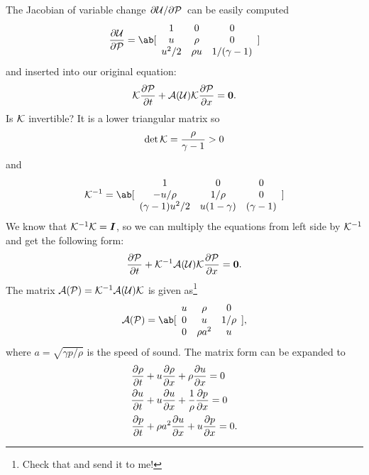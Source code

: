\documentclass[justified, nobib]{tufte-handout}
\begin{document}
The Jacobian of variable change \(\pdv{\mathcal{U}}/{\mathcal{P}}\) can be easily computed
\[
	\pdv{\U}{\P} =
	\ab[
		\begin{array}{ccc}
			1     & 0      & 0             \\
			u     & \rho   & 0             \\
			u^2/2 & \rho u & 1/(\gamma -1)
		\end{array}
	]
\]
and inserted into our original equation:
\[
	\mathcal{K}\pdv{\mathcal{P}}{t} + \mathcal{A}(\mathcal{U})\mathcal{K}\pdv{\mathcal{P}}{x} = \bm{0}.
\]
Is \(\mathcal{K}\) invertible? It is a lower triangular matrix so
\[
	\det \mathcal{K} = \frac{\rho}{\gamma - 1} > 0
\]
and
\[
	\K^{-1} = \ab[
		\begin{array}{ccc}
			1                & 0             & 0           \\
			-u/\rho          & 1/\rho        & 0           \\
			(\gamma -1)u^2/2 & u(1 - \gamma) & (\gamma -1)
		\end{array}
	]
\]
We know that \(\mathcal{K}^{-1}\mathcal{K} = \bm{I}\), so we can multiply the equations
from left side by \(\mathcal{K}^{-1}\) and get the following form:
\[
	\pdv{\mathcal{P}}{t} + \mathcal{K}^{-1}\mathcal{A}(\mathcal{U})\mathcal{K}\pdv{\mathcal{P}}{x} = \bm{0}.
\]
The matrix \(\mathcal{A}(\mathcal{P}) = \mathcal{K}^{-1}\mathcal{A}(\mathcal{U})\mathcal{K}\) is given as\footnote{Check that and send it to me!}
\[
	\A(\P) = \ab[
		\begin{array}{ccc}
			u & \rho     & 0      \\
			0 & u        & 1/\rho \\
			0 & \rho a^2 & u
		\end{array}
	],
\]
where \(a = \sqrt{\gamma p /\rho}\) is the speed of sound. The
matrix form can be expanded to
\begin{equation}
	\begin{split}
		\pdv{\rho}{t} & + u\pdv{\rho}{x} + \rho\pdv{u}{x} = 0        \\
		\pdv{u}{t}    & + u\pdv{u}{x} + \frac{1}{\rho}\pdv{p}{x} = 0 \\
		\pdv{p}{t}    & + \rho a^2 \pdv{u}{x} + u\pdv{p}{x} = 0.
	\end{split}
	\label{eq:primitive}
\end{equation}
\end{document}
